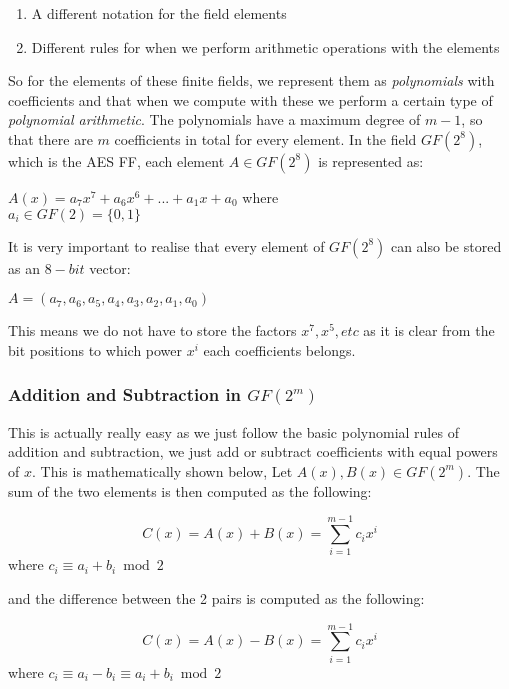 \begin{enumerate}
\item{A different notation for the field elements}
\item{Different rules for when we perform arithmetic operations with the elements}
\end{enumerate}

So for the elements of these finite fields, we represent them as \textit{polynomials} with coefficients and that when we compute with these we perform a certain type of \textit{polynomial arithmetic}. The polynomials have a maximum degree of $m-1$, so that there are $m$ coefficients in total for every element. In the field $GF(2^8)$, which is the AES FF, each element $A \in GF(2^8)$ is represented as:

\begin{center}
$A(x) = a_7x^7 + a_6x^6 + ... + a_1x + a_0$ where \\
$a_i \in GF(2) = \{0,1\}$
\end{center}

It is very important to realise that every element of $GF(2^8)$ can also be stored as an $8-bit$ vector:

\begin{center}
$A = (a_7,a_6,a_5,a_4,a_3,a_2,a_1,a_0)$
\end{center}

This means we do not have to store the factors $x^7,x^5,etc$ as it is clear from the bit positions to which power $x^i$ each coefficients belongs.

\subsubsection{Addition and Subtraction in $GF(2^m)$}

This is actually really easy as we just follow the basic polynomial rules of addition and subtraction, we just add or subtract coefficients with equal powers of $x$. This is mathematically shown below, Let $A(x), B(x) \in GF(2^m)$. The sum of the two elements is then computed as the following: 

\begin{center}
$$C(x) = A(x) + B(x) = \sum_{i=1}^{m-1} c_ix^i$$ where
$c_i \equiv a_i + b_i \bmod 2$
\end{center}

and the difference between the 2 pairs is computed as the following:

\begin{center}
$$C(x) = A(x) - B(x) = \sum_{i=1}^{m-1} c_ix^i$$ where
$c_i \equiv a_i - b_i \equiv a_i + b_i \bmod 2$
\end{center}

